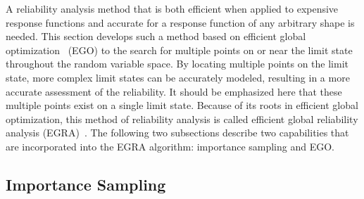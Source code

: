 
A reliability analysis method that is both efficient when applied to
expensive response functions and accurate for a response function of
any arbitrary shape is needed. This section develops such a method
based on efficient global optimization~\cite{Jon98} (EGO) to the
search for multiple points on or near the limit state throughout the
random variable space. By locating multiple points on the limit state,
more complex limit states can be accurately modeled, resulting in a
more accurate assessment of the reliability. It should be emphasized
here that these multiple points exist on a single limit state. Because
of its roots in efficient global optimization, this method of
reliability analysis is called efficient global reliability analysis
(EGRA)~\cite{Bic07}.  The following two subsections describe two
capabilities that are incorporated into the EGRA algorithm: importance
sampling and EGO.

\subsection{Importance Sampling}\label{uq:reliability:global:ais}

